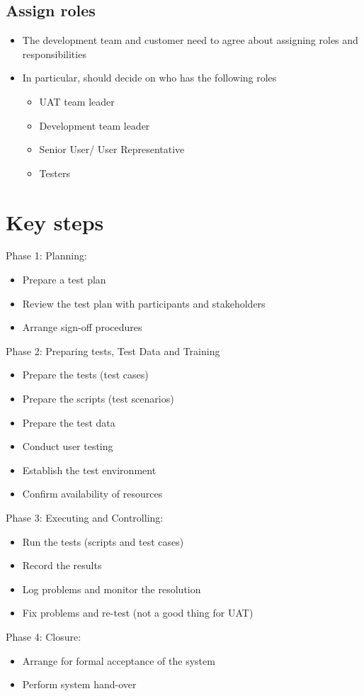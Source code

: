 \documentclass{article}[18pt]
\begin{document}
\subsection{Assign roles}
\begin{itemize}
	\item The development team and customer need to agree about assigning roles and responsibilities
	\item In particular, should decide on who has the following roles
	\begin{itemize}
		\item UAT team leader
		\item Development team leader
		\item Senior User/ User Representative
		\item Testers
	\end{itemize}
\end{itemize}
\section{Key steps}
Phase 1: Planning:
\begin{itemize}
	\item Prepare a test plan
	\item Review the test plan with participants and stakeholders
	\item Arrange sign-off procedures
\end{itemize}
Phase 2: Preparing tests, Test Data and Training
\begin{itemize}
	\item Prepare the tests (test cases)
	\item Prepare the scripts (test scenarios)
	\item Prepare the test data
	\item Conduct user testing
	\item Establish the test environment
	\item Confirm availability of resources
\end{itemize}
Phase 3: Executing and Controlling:
\begin{itemize}
	\item Run the tests (scripts and test cases)
	\item Record the results
	\item Log problems and monitor the resolution
	\item Fix problems and re-test (not a good thing for UAT)
\end{itemize}
Phase 4: Closure:
\begin{itemize}
	\item Arrange for formal acceptance of the system
	\item Perform system hand-over
\end{itemize}
\end{document}
